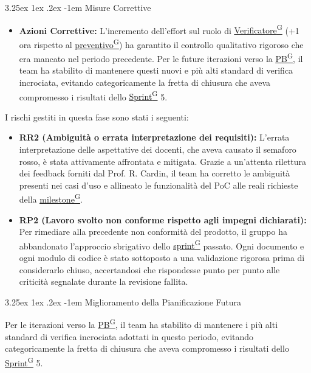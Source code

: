 \documentclass[a4paper,12pt]{article}
\makeatletter
\renewcommand\paragraph{\@startsection{paragraph}{5}{\z@}%
  {3.25ex \@plus1ex \@minus.2ex}%
  {-1em}%
  {\normalfont\normalsize\bfseries}}
\providecommand{\glslink}[2]{\href{https://alittlebyte-19.github.io/Documentazione/glossario.html\#gls-#1}{\underline{#2}\textsuperscript{\scriptsize G}}}
\makeatother
\begin{document}
\paragraph{Misure Correttive}

\begin{itemize}
    \item \textbf{Azioni Correttive:} L'incremento dell'effort sul ruolo di \glslink{verificatore}{Verificatore} (+1 ora rispetto al \glslink{preventivo}{preventivo}) ha garantito il controllo qualitativo rigoroso che era mancato nel periodo precedente. Per le future iterazioni verso la \glslink{pb-product-baseline}{PB}, il team ha stabilito di mantenere questi nuovi e più alti standard di verifica incrociata, evitando categoricamente la fretta di chiusura che aveva compromesso i risultati dello \glslink{sprint}{Sprint} 5.
\end{itemize}
I rischi gestiti in questa fase sono stati i seguenti:
\begin{itemize}
    \item \textbf{RR2 (Ambiguità o errata interpretazione dei requisiti):} L'errata interpretazione delle aspettative dei docenti, che aveva causato il semaforo rosso, è stata attivamente affrontata e mitigata. Grazie a un'attenta rilettura dei feedback forniti dal Prof. R. Cardin, il team ha corretto le ambiguità presenti nei casi d'uso e allineato le funzionalità del PoC alle reali richieste della \glslink{milestone}{milestone}.
    \item \textbf{RP2 (Lavoro svolto non conforme rispetto agli impegni dichiarati):} Per rimediare alla precedente non conformità del prodotto, il gruppo ha abbandonato l'approccio sbrigativo dello \glslink{sprint}{sprint} passato. Ogni documento e ogni modulo di codice è stato sottoposto a una validazione rigorosa prima di considerarlo chiuso, accertandosi che rispondesse punto per punto alle criticità segnalate durante la revisione fallita.
\end{itemize}


\paragraph{Miglioramento della Pianificazione Futura}

Per le iterazioni verso la \glslink{pb-product-baseline}{PB}, il team ha stabilito di mantenere i più alti standard di verifica incrociata adottati in questo periodo, evitando categoricamente la fretta di chiusura che aveva compromesso i risultati dello \glslink{sprint}{Sprint} 5.
\end{document}

